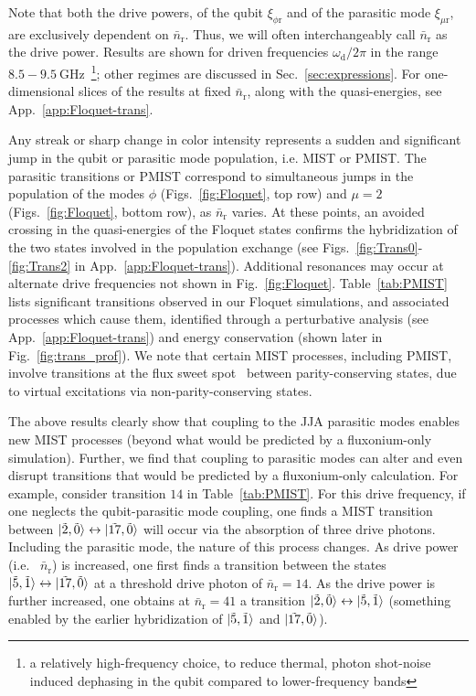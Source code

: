 \documentclass[%
reprint,
superscriptaddress,
 amsmath,amssymb,
 aps,
 prx,
longbibliography,
floatfix,
]{revtex4-2}
\begin{document}
Note that both the drive powers, of the qubit $\xi_{\phi \textrm{r}}$ and of the parasitic mode $\xi_{\mu \textrm{r}}$, are exclusively dependent on $\bar n_\textrm{r}$. Thus, we will often interchangeably call $\bar n_\textrm{r}$ as the drive power. Results are shown for driven frequencies $\omega_\textrm{d} / 2 \pi$ in the range  
$8.5 - 9.5 \ \mathrm{GHz}$~\footnote{a relatively high-frequency choice, to reduce thermal, photon shot-noise induced dephasing in the qubit compared to lower-frequency bands}; other regimes are discussed in Sec.~\ref{sec:expressions}. For one-dimensional slices of the results at fixed $\bar n_\textrm{r}$, along with the quasi-energies, see App.~\ref{app:Floquet-trans}. 

Any streak or sharp change in color intensity represents a sudden and significant jump in the qubit or parasitic mode population, i.e. MIST or PMIST. The parasitic transitions or PMIST correspond to simultaneous jumps in the population of the modes $\phi$ (Figs.~\ref{fig:Floquet}, top row) and $\mu=2$ (Figs.~\ref{fig:Floquet}, bottom row), as $\bar{n}_\textrm{r}$ varies. At these points, an avoided crossing in the quasi-energies of the Floquet states confirms the hybridization of the two states involved in the population exchange (see Figs.~\ref{fig:Trans0}-\ref{fig:Trans2} in App.~\ref{app:Floquet-trans}). Additional resonances may occur at alternate drive frequencies not shown in Fig.~\ref{fig:Floquet}. Table~\ref{tab:PMIST} lists significant transitions observed in our Floquet simulations, and associated processes which cause them, identified through a perturbative analysis (see App.~\ref{app:Floquet-trans}) and energy conservation (shown later in Fig.~\ref{fig:trans_prof}). We note that certain MIST processes, including PMIST, involve transitions at the flux sweet spot~\cite{zhu_circuit_2013} between parity-conserving states, due to virtual excitations via non-parity-conserving states. 

The above results clearly show that coupling to the JJA parasitic modes enables new MIST processes (beyond what would be predicted by a fluxonium-only simulation).  Further, we find that coupling to parasitic modes can alter and even disrupt transitions that would be predicted by a fluxonium-only calculation.  For example, consider transition $14$ in Table~\ref{tab:PMIST}.  For this drive frequency, if one neglects the qubit-parasitic mode coupling, one finds a MIST transition between   
$ \ket{\tilde{2},\tilde{0}} \leftrightarrow \ket{\tilde{17},\tilde{0}}$ will occur via the absorption of three drive photons.  
Including the parasitic mode, the nature of this process changes.  As drive power (i.e. ~$\bar{n}_\textrm{r}$) is increased, one first finds a transition between the states $\ket{\tilde{5},\tilde{1}}\leftrightarrow \ket{\tilde{17},\tilde{0}}$ at a threshold drive photon of $\bar n_\textrm{r}=14$. As the drive power is further increased, one obtains at $\bar n_\textrm{r}=41$ a transition $\ket{\tilde{2},\tilde{0}}\leftrightarrow \ket{\tilde{5},\tilde{1}}$ (something enabled by the earlier hybridization of $\ket{\tilde{5},\tilde{1}}$ 
and  $\ket{\tilde{17},\tilde{0}}$).
\end{document}
